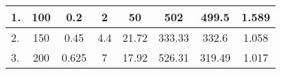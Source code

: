 \documentclass[a4paper,12pt]{article}
\begin{document}
\begin{table}[H]
\begin{tabular}{|l|c|c|c|c|c|c|c|}
			1.                                                                                      & 100                                                                                  & 0.2                                                                                    & 2                                                                                    & 50                                                                                                        & 502                                                                                                  & 499.5                                                                                                 & 1.589                                                                                                  \\ \hline
			2.                                                                                      & 150                                                                                  & 0.45                                                                                   & 4.4                                                                                  & 21.72                                                                                                     & 333.33                                                                                               & 332.6                                                                                                 & 1.058                                                                                                  \\ \hline
			3.                                                                                      & 200                                                                                  & 0.625                                                                                  & 7                                                                                    & 17.92                                                                                                     & 526.31                                                                                               & 319.49                                                                                                & 1.017                                                                                                  \\ \hline
	\end{tabular}
\end{table}
\end{document}
